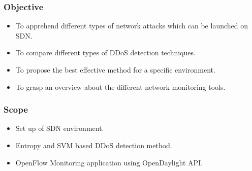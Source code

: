 \documentclass[10pt]{beamer}
\begin{document}
\begin{frame}
\frametitle{Objective}
\begin{center}
\begin{itemize}
\footnotesize
\item
To apprehend different types of network attacks which can be launched on SDN.
\item
To compare different types of DDoS detection techniques.
\item
To propose the best effective method for a specific environment.
\item
To grasp an overview about the different network monitoring tools.
\end{itemize}
\end{center}
\end{frame}

\begin{frame}
\frametitle{Scope}
\begin{center}
\begin{itemize}
\footnotesize
\item
Set up of SDN environment.
\item
Entropy and SVM based DDoS detection method.
\item
OpenFlow Monitoring application using OpenDaylight API.
\end{itemize}
\end{center}
\end{frame}








\end{document}
